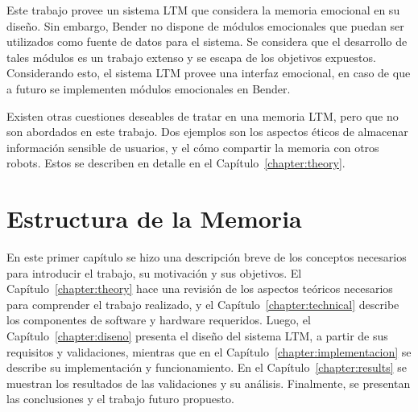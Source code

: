 Este trabajo provee un sistema LTM que considera la memoria emocional en su diseño. Sin embargo, Bender no dispone de módulos emocionales que puedan ser utilizados como fuente de datos para el sistema. Se considera que el desarrollo de tales módulos es un trabajo extenso y se escapa de los objetivos expuestos. Considerando esto, el sistema LTM provee una interfaz emocional, en caso de que a futuro se implementen módulos emocionales en Bender.

Existen otras cuestiones deseables de tratar en una memoria LTM, pero que no son abordados en este trabajo. Dos ejemplos son los aspectos éticos de almacenar información sensible de usuarios, y el cómo compartir la memoria con otros robots. Estos se describen en detalle en el Capítulo~\ref{chapter:theory}.


\section{Estructura de la Memoria}

En este primer capítulo se hizo una descripción breve de los conceptos necesarios para introducir el trabajo, su motivación y sus objetivos. El Capítulo~\ref{chapter:theory} hace una revisión de los aspectos teóricos necesarios para comprender el trabajo realizado, y el Capítulo~\ref{chapter:technical} describe los componentes de software y hardware requeridos. Luego, el Capítulo~\ref{chapter:diseno} presenta el diseño del sistema LTM, a partir de sus requisitos y validaciones, mientras que en el Capítulo~\ref{chapter:implementacion} se describe su implementación y funcionamiento. En el Capítulo~\ref{chapter:results} se muestran los resultados de las validaciones y su análisis. Finalmente, se presentan las conclusiones y el trabajo futuro propuesto.





